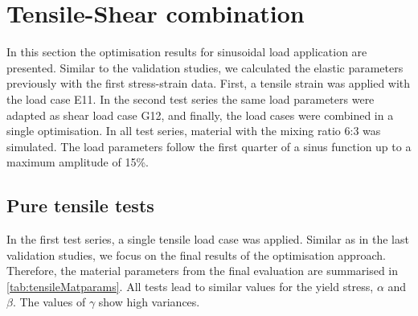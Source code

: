 


\section{Tensile-Shear combination} \label{sec:TensShearResults}
In this section the optimisation results for sinusoidal load application are presented. Similar to the validation studies, we calculated the elastic parameters previously with the first stress-strain data. First, a tensile strain was applied with the load case E11. In the second test series the same load parameters were adapted as shear load case G12, and finally, the load cases were combined in a single optimisation. In all test series, material with the mixing ratio 6:3 was simulated. The load parameters follow the first quarter of a sinus function up to a maximum amplitude of 15\%. 

\subsection{Pure tensile tests}
In the first test series, a single tensile load case was applied. Similar as in the last validation studies, we focus on the final results of the optimisation approach. Therefore, the material parameters from the final evaluation are summarised in \autoref{tab:tensileMatparams}. All tests lead to similar values for the yield stress, $\alpha$ and $\beta$. The values of $\gamma$ show high variances. 


